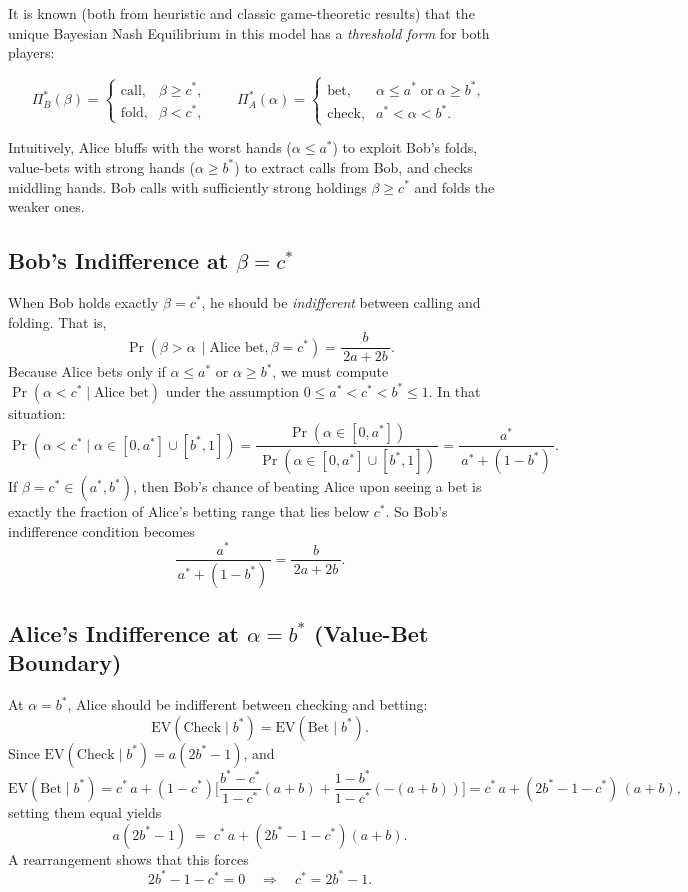 \documentclass{article}
\begin{document}
It is known (both from heuristic and classic game-theoretic results) that the unique Bayesian Nash Equilibrium in this model has a \emph{threshold form} for both players:

\[
\Pi_B^*(\beta)=
\begin{cases}
\text{call}, & \beta\ge c^*,\\
\text{fold}, & \beta<c^*,
\end{cases}
\qquad
\Pi_A^*(\alpha)=
\begin{cases}
\text{bet}, & \alpha\le a^*\;\text{or}\;\alpha\ge b^*,\\
\text{check}, & a^*<\alpha<b^*.
\end{cases}
\]

Intuitively, Alice bluffs with the worst hands ($\alpha\le a^*$) to exploit Bob's folds, value-bets with strong hands ($\alpha\ge b^*$) to extract calls from Bob, and checks middling hands. Bob calls with sufficiently strong holdings $\beta\ge c^*$ and folds the weaker ones.

\subsection{Bob's Indifference at $\beta = c^*$}

When Bob holds exactly $\beta = c^*$, he should be \emph{indifferent} between calling and folding.  That is,
\[
\Pr(\beta > \alpha \,\mid \text{Alice bet}, \beta=c^*) 
= \frac{b}{\,2a + 2b\,}.
\]
Because Alice bets only if $\alpha \le a^*$ or $\alpha \ge b^*$, we must compute $\Pr(\alpha < c^*\mid \text{Alice bet})$ under the assumption $0 \le a^* < c^* < b^* \le 1$.  In that situation:
\[
\Pr(\alpha < c^*\mid \alpha \in [0,a^*]\cup[b^*,1])
= \frac{\Pr(\alpha \in [0,a^*])}{\,\Pr(\alpha \in [0,a^*]\cup[b^*,1])\,}
= \frac{a^*}{\,a^* + (1-b^*)\,}.
\]
If $\beta=c^*\in(a^*,b^*)$, then Bob's chance of beating Alice upon seeing a bet is exactly the fraction of Alice's betting range that lies below $c^*$.  So Bob's indifference condition becomes
\begin{equation}
\frac{a^*}{\,a^* + (1-b^*)\,} 
= \frac{b}{\,2a + 2b\,}.
\label{Eq:BobIndiff}
\end{equation}

\subsection{Alice's Indifference at $\alpha = b^*$ (Value-Bet Boundary)}

At $\alpha=b^*$, Alice should be indifferent between checking and betting:
\[
\text{EV}(\text{Check}\mid b^*) = \text{EV}(\text{Bet}\mid b^*).
\]
Since $\text{EV}(\text{Check}\mid b^*) = a(2b^* -1)$, and
\[
\text{EV}(\text{Bet}\mid b^*)
= c^*\,a 
+ (1-c^*)\biggl[\frac{b^* - c^*}{1-c^*}(a+b) + \frac{1-b^*}{1-c^*}(-(a+b))\biggr]
= c^*\,a + (2b^* -1 - c^*)\,(a+b),
\]
setting them equal yields
\[
a(2b^*-1) \;=\; c^*\,a + (2b^* -1 - c^*)(a+b).
\]
A rearrangement shows that this forces
\begin{equation}
2b^* -1 - c^* = 0 \quad\Longrightarrow\quad c^*=2b^*-1.
\label{Eq:ValBound}
\end{equation}
\end{document}
